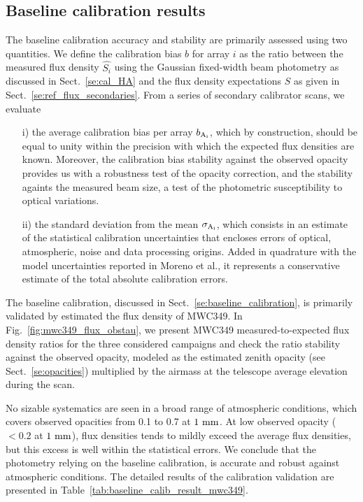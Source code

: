 %
%
%
\subsection{Baseline calibration results}

The baseline calibration accuracy and stability are primarily assessed
using two quantities. We define the calibration bias $b$ for array $i$ as
the ratio between the measured flux density $\hat{S_{i}}$ using the
Gaussian fixed-width beam photometry as discussed in
Sect.~\ref{se:cal_HA} and the flux density expectations $\hat{S}$ as
given in Sect.~\ref{se:ref_flux_secondaries}. From a series of
secondary calibrator scans, we evaluate
\begin{itemize}
\item[i)] the average calibration bias per array $b_{\rm A_i}$,
  which by construction, should be equal to unity within the precision
  with which the expected flux densities are known. Moreover, 
  the calibration bias stability against the observed opacity provides
  us with a robustness test of the opacity correction, and the stability
  againts the measured beam size, a test of the photometric
  susceptibility to optical variations. %
\item[ii)] the standard deviation from the mean $\sigma_{\rm A_i}$,
  which consists in an estimate of the statistical calibration
  uncertainties that encloses errors of optical, atmospheric, noise
  and data processing origins. Added in quadrature with the model
  uncertainties reported in Moreno et al., it represents a
  conservative estimate of the total absolute calibration errors.
\end{itemize}


The baseline calibration, discussed in Sect.~\ref{se:baseline_calibration}, is primarily
validated by estimated the flux density of MWC349. In
Fig.~\ref{fig:mwc349_flux_obstau}, we present MWC349
measured-to-expected flux density ratios for the three considered
campaigns and check the ratio stability against the observed opacity,
modeled as the estimated zenith opacity (see Sect.~\ref{se:opacities}) multiplied
by the airmass at the telescope average elevation during the scan. 


No sizable systematics are seen in a broad range
of atmospheric conditions, which covers observed opacities from 0.1 to
0.7 at $1~\rm{mm}$. At low observed
opacity ($<0.2$ at $1~\rm{mm}$), flux densities tends to mildly exceed
the average flux densities, but this excess is well within the statistical
errors. We conclude that the photometry relying on the baseline
calibration, is accurate and robust against atmospheric
conditions. The detailed results of the calibration validation are
presented in Table~\ref{tab:baseline_calib_result_mwc349}.


